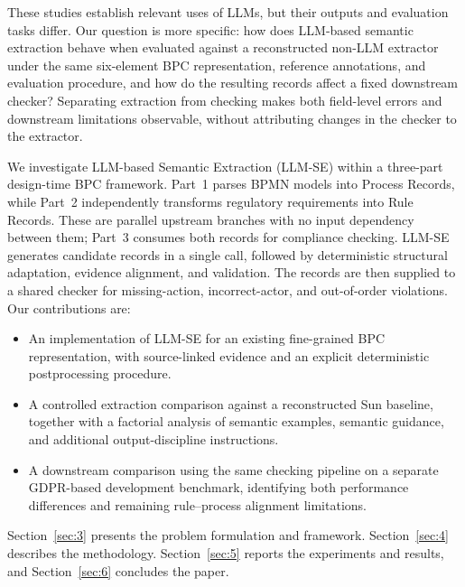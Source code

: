 These studies establish relevant uses of LLMs, but their outputs and evaluation tasks differ. Our question is more specific: how does LLM-based semantic extraction behave when evaluated against a reconstructed non-LLM extractor under the same six-element BPC representation, reference annotations, and evaluation procedure, and how do the resulting records affect a fixed downstream checker? Separating extraction from checking makes both field-level errors and downstream limitations observable, without attributing changes in the checker to the extractor.

We investigate LLM-based Semantic Extraction (LLM-SE) within a three-part design-time BPC framework. Part~1 parses BPMN models into Process Records, while Part~2 independently transforms regulatory requirements into Rule Records. These are parallel upstream branches with no input dependency between them; Part~3 consumes both records for compliance checking. LLM-SE generates candidate records in a single call, followed by deterministic structural adaptation, evidence alignment, and validation. The records are then supplied to a shared checker for missing-action, incorrect-actor, and out-of-order violations. Our contributions are:
\begin{itemize}
    \item An implementation of LLM-SE for an existing fine-grained BPC representation, with source-linked evidence and an explicit deterministic postprocessing procedure.
    \item A controlled extraction comparison against a reconstructed Sun baseline, together with a factorial analysis of semantic examples, semantic guidance, and additional output-discipline instructions.
    \item A downstream comparison using the same checking pipeline on a separate GDPR-based development benchmark, identifying both performance differences and remaining rule--process alignment limitations.
\end{itemize}

Section~\ref{sec:3} presents the problem formulation and framework. Section~\ref{sec:4} describes the methodology. Section~\ref{sec:5} reports the experiments and results, and Section~\ref{sec:6} concludes the paper.
